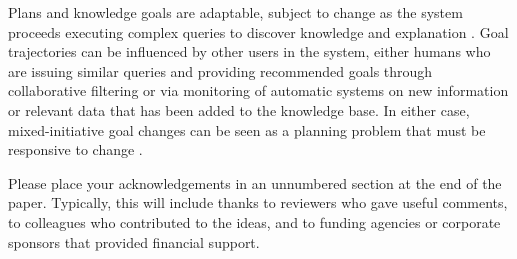 \documentclass[11pt,letterpaper]{article}
\begin{document}
Plans and knowledge goals are adaptable, subject to change as the system proceeds executing complex queries to discover knowledge and explanation \cite{munoz-avila_case-based_2008}. Goal trajectories can be influenced by other users in the system, either humans who are issuing similar queries and providing recommended goals through collaborative filtering \cite{hayes_case-based_2001} or via monitoring of automatic systems on new information or relevant data that has been added to the knowledge base. In either case, mixed-initiative goal changes can be seen as a planning problem that must be responsive to change \cite{cox_mixed-initiative_2007}.


\begin{acknowledgements}
\noindent
Please place your acknowledgements in an unnumbered section at the
end of the paper. Typically, this will include thanks to reviewers
who gave useful comments, to colleagues who contributed to the ideas,
and to funding agencies or corporate sponsors that provided financial
support.
\end{acknowledgements}

\vspace{-0.25in}

{\parindent -10pt\leftskip 10pt\noindent



}

\end{document}
